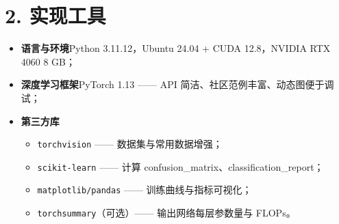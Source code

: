\documentclass[UTF8]{article}
\begin{document}
\section*{2. 实现工具}
\begin{itemize}
    \item \textbf{语言与环境}\;Python 3.11.12，Ubuntu 24.04 + CUDA 12.8，NVIDIA RTX 4060 8 GB；
    \item \textbf{深度学习框架}\;PyTorch 1.13 —— API 简洁、社区范例丰富、动态图便于调试；
    \item \textbf{第三方库}\;
          \begin{itemize}
              \item \texttt{torchvision} —— 数据集与常用数据增强；
              \item \texttt{scikit-learn} —— 计算 confusion\_matrix、classification\_report；
              \item \texttt{matplotlib/pandas} —— 训练曲线与指标可视化；
              \item \texttt{torchsummary}（可选）—— 输出网络每层参数量与 FLOPs。
          \end{itemize}
\end{itemize}

\end{document}
